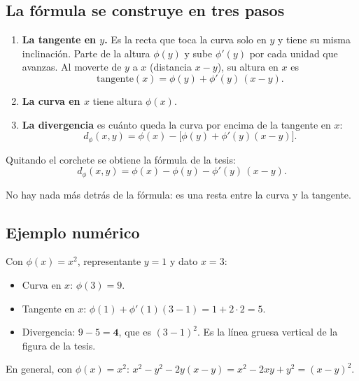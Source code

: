\documentclass[11pt,a4paper]{article}
\newenvironment{idea}{\par\begin{center}\begin{lrbox}{\ideabox}\begin{minipage}{0.9\linewidth}}{\end{minipage}\end{lrbox}\fcolorbox{blue!40!black}{blue!5}{\usebox{\ideabox}}\end{center}}
\begin{document}
\subsection{La fórmula se construye en tres pasos}

\begin{enumerate}
  \item \textbf{La tangente en $y$.} Es la recta que toca la curva solo en $y$ y
  tiene su misma inclinación. Parte de la altura $\phi(y)$ y sube $\phi'(y)$ por
  cada unidad que avanzas. Al moverte de $y$ a $x$ (distancia $x-y$), su altura
  en $x$ es
  \[
    \text{tangente}(x)=\phi(y)+\phi'(y)\,(x-y).
  \]
  \item \textbf{La curva en $x$} tiene altura $\phi(x)$.
  \item \textbf{La divergencia} es cuánto queda la curva por encima de la
  tangente en $x$:
  \[
    d_\phi(x,y)=\phi(x)-\bigl[\phi(y)+\phi'(y)(x-y)\bigr].
  \]
\end{enumerate}
Quitando el corchete se obtiene la fórmula de la tesis:
\begin{equation}\label{eq:b1}
  d_\phi(x,y)=\phi(x)-\phi(y)-\phi'(y)\,(x-y).
\end{equation}
\begin{idea}
No hay nada más detrás de la fórmula: es una resta entre la curva y la tangente.
\end{idea}

\subsection{Ejemplo numérico}

Con $\phi(x)=x^2$, representante $y=1$ y dato $x=3$:
\begin{itemize}
  \item Curva en $x$: $\phi(3)=9$.
  \item Tangente en $x$: $\phi(1)+\phi'(1)(3-1)=1+2\cdot 2=5$.
  \item Divergencia: $9-5=\mathbf{4}$, que es $(3-1)^2$. Es la línea gruesa
  vertical de la figura de la tesis.
\end{itemize}
En general, con $\phi(x)=x^2$:
$x^2-y^2-2y(x-y)=x^2-2xy+y^2=(x-y)^2$.

\begin{center}
\end{center}
\end{document}
